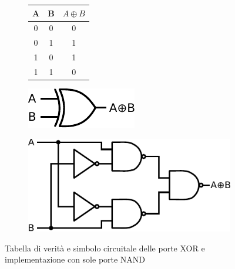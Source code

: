 \begin{figure}[htpc]
\centering
	\begin{subfigure}[hc]{.4\textwidth}
		\centering
		{\renewcommand{\arraystretch}{1.1}%
		\begin{tabular}{|c|c|c|}
		\hline
		A & B & $A \oplus B$ \\
		\hline
		0 & 0 & 0\\
		\hline
		0 & 1 & 1\\
		\hline
		1 & 0 & 1\\
		\hline
		1 & 1 & 0\\
		\hline
		\end{tabular}}
		\label{tab9:XOR}
        \end{subfigure}
        \begin{subfigure}[hc]{.15\textwidth}
		\centering
		\includegraphics[width=.99\textwidth]{../E09/latex/XOR.pdf}
		\label{cir9:XOR}
	\end{subfigure}
        \begin{subfigure}[hc]{.4\textwidth}
		\centering
		\includegraphics[width=.7\textwidth]{../E09/latex/iXOR.pdf}
		\label{cir9:iXOR}
        \end{subfigure}
\caption{Tabella di verità e simbolo circuitale delle porte XOR e implementazione con sole porte NAND}
\end{figure}


